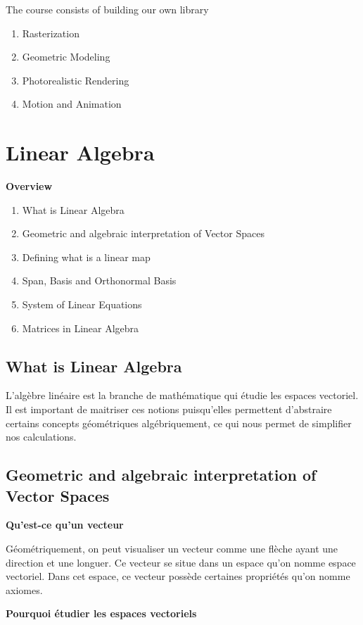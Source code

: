 \documentclass{article}
\begin{document}
The course consists of building our own library
\begin{enumerate}
    \item Rasterization
    \item Geometric Modeling
    \item Photorealistic Rendering
    \item Motion and Animation
\end{enumerate}

\section{Linear Algebra}

\textbf{Overview}

\begin{enumerate}
    \item What is Linear Algebra
    \item Geometric and algebraic interpretation of Vector Spaces
    \item Defining what is a linear map
    \item Span, Basis and Orthonormal Basis
    \item System of Linear Equations
    \item Matrices in Linear Algebra
\end{enumerate}

\subsection{What is Linear Algebra}

L'algèbre linéaire est la branche de mathématique qui étudie les espaces
vectoriel. Il est important de maitriser ces notions puisqu'elles
permettent d'abstraire certains concepts géométriques algébriquement,
ce qui nous permet de simplifier nos calculations.

\subsection{Geometric and algebraic interpretation of Vector Spaces}

\textbf{Qu'est-ce qu'un vecteur}

Géométriquement, on peut visualiser un vecteur comme une flèche ayant
une direction et une longuer. Ce vecteur se situe dans un espace qu'on
nomme espace vectoriel. Dans cet espace, ce vecteur possède certaines
propriétés qu'on nomme axiomes.

\textbf{Pourquoi étudier les espaces vectoriels}
\end{document}
